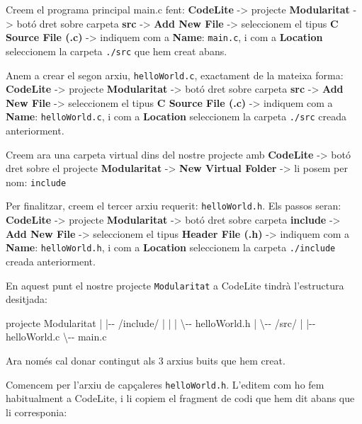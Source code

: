 \documentclass[]{book}
\newenvironment{Shaded}{\begin{snugshade}}{\end{snugshade}}
\newcommand{\NormalTok}[1]{#1}
\begin{document}
Creem el programa principal main.c fent: \textbf{CodeLite} -\textgreater{} projecte \textbf{Modularitat} -\textgreater{} botó dret sobre carpeta \textbf{src} -\textgreater{} \textbf{Add New File} -\textgreater{} seleccionem el tipus \textbf{C Source File (.c)} -\textgreater{} indiquem com a \textbf{Name}: \texttt{main.c}, i com a \textbf{Location} seleccionem la carpeta \texttt{./src} que hem creat abans.

Anem a crear el segon arxiu, \texttt{helloWorld.c}, exactament de la mateixa forma: \textbf{CodeLite} -\textgreater{} projecte \textbf{Modularitat} -\textgreater{} botó dret sobre carpeta \textbf{src} -\textgreater{} \textbf{Add New File} -\textgreater{} seleccionem el tipus \textbf{C Source File (.c)} -\textgreater{} indiquem com a \textbf{Name}: \texttt{helloWorld.c}, i com a \textbf{Location} seleccionem la carpeta \texttt{./src} creada anteriorment.

Creem ara una carpeta virtual dins del nostre projecte amb \textbf{CodeLite} -\textgreater{} botó dret sobre el projecte \textbf{Modularitat} -\textgreater{} \textbf{New Virtual Folder} -\textgreater{} li posem per nom: \texttt{include}

Per finalitzar, creem el tercer arxiu requerit: \texttt{helloWorld.h}. Els passos seran: \textbf{CodeLite} -\textgreater{} projecte \textbf{Modularitat} -\textgreater{} botó dret sobre carpeta \textbf{include} -\textgreater{} \textbf{Add New File} -\textgreater{} seleccionem el tipus \textbf{Header File (.h)} -\textgreater{} indiquem com a \textbf{Name}: \texttt{helloWorld.h}, i com a \textbf{Location} seleccionem la carpeta \texttt{./include} creada anteriorment.

En aquest punt el nostre projecte \texttt{Modularitat} a CodeLite tindrà l'estructura desitjada:

\begin{Shaded}
\begin{Highlighting}[]
\NormalTok{projecte Modularitat}
\NormalTok{   |}
\NormalTok{   |{-}{-} /include/}
\NormalTok{   |     |}
\NormalTok{   |     \textbackslash{}{-}{-} helloWorld.h}
\NormalTok{   |}
\NormalTok{   \textbackslash{}{-}{-} /src/}
\NormalTok{         |}
\NormalTok{         |{-}{-} helloWorld.c}
\NormalTok{         \textbackslash{}{-}{-} main.c}
\end{Highlighting}
\end{Shaded}

Ara només cal donar contingut als 3 arxius buits que hem creat.

Comencem per l'arxiu de capçaleres \texttt{helloWorld.h}. L'editem com ho fem habitualment a CodeLite, i li copiem el fragment de codi que hem dit abans que li corresponia:
\end{document}

